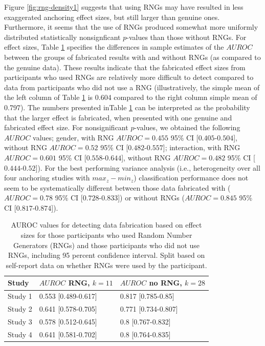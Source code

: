 \documentclass[a5paper]{book}
\begin{document}
Figure \ref{fig:rng-density1} suggests that using RNGs may have resulted
in less exaggerated anchoring effect sizes, but still larger than
genuine ones. Furthermore, it seems that the use of RNGs produced
somewhat more uniformly distributed statistically nonsignficant
\(p\)-values than those without RNGs. For effect sizes, Table
\ref{tab:rng-auc1} specifies the differences in sample estimates of the
\(AUROC\) between the groups of fabricated results with and without RNGs
(as compared to the genuine data). These results indicate that the
fabricated effect sizes from participants who used RNGs are relatively
more difficult to detect compared to data from participants who did not
use a RNG (illustratively, the simple mean of the left column of Table
\ref{tab:rng-auc1} is 0.604 compared to the right column simple mean of
0.797). The numbers presented inTable \ref{tab:rng-auc1} can be
interpreted as the probability that the larger effect is fabricated,
when presented with one genuine and fabricated effect size. For
nonsignificant \(p\)-values, we obtained the following \(AUROC\) values;
gender, with RNG \(AUROC=0.455\) 95\% CI {[}\(0.405\)-\(0.504\){]},
without RNG \(AUROC=0.52\) 95\% CI {[}\(0.482\)-\(0.557\){]};
interaction, with RNG \(AUROC=0.601\) 95\% CI {[}\(0.558\)-\(0.644\){]},
without RNG \(AUROC=0.482\) 95\% CI {[}\(0.444\)-\(0.52\){]}). For the
best performing variance analysis (i.e., heterogeneity over all four
anchoring studies with \(max_z-min_z\)) classification performance does
not seem to be systematically different between those data fabricated
with (\(AUROC=0.78\) 95\% CI {[}\(0.728\)-\(0.833\){]}) or without RNGs
(\(AUROC=0.845\) 95\% CI {[}\(0.817\)-\(0.874\){]}).

\begin{table}[!h]

\caption{\label{tab:rng-auc1}AUROC values for detecting data fabrication based on effect sizes for those participants who used Random Number Generators (RNGs) and those participants who did not use RNGs, including 95 percent confidence interval. Split based on self-report data on whether RNGs were used by the participant.}
\centering
\begin{tabular}{lll}
\toprule
Study & $AUROC$ RNG, $k=11$ & $AUROC$ no RNG, $k=28$\\
\midrule
\rowcolor{gray!6}  Study 1 & 0.553 [0.489-0.617] & 0.817 [0.785-0.85]\\
Study 2 & 0.641 [0.578-0.705] & 0.771 [0.734-0.807]\\
\rowcolor{gray!6}  Study 3 & 0.578 [0.512-0.645] & 0.8 [0.767-0.832]\\
Study 4 & 0.641 [0.581-0.702] & 0.8 [0.764-0.835]\\
\bottomrule
\end{tabular}
\end{table}
\end{document}
